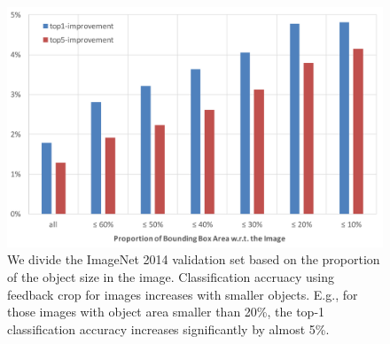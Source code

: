 \setlength{\tabcolsep}{2pt}
\begin{figure}[htb]
\begin{center}
\includegraphics[width=\columnwidth]{figs/re-classification/delta.pdf}
\caption{We divide the ImageNet 2014 validation set based on the proportion of the object size in the image. Classification accruacy using feedback crop for images increases with smaller objects. E.g., for those images with object area smaller than 20\%, the top-1 classification accuracy increases significantly by almost 5\%.}
\label{fig:reclassification_delta}
\end{center}
\end{figure}

